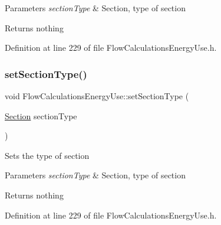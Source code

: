 \begin{DoxyParams}{Parameters}
{\em section\+Type} & Section, type of section\\
\hline
\end{DoxyParams}
\begin{DoxyReturn}{Returns}
nothing 
\end{DoxyReturn}


Definition at line 229 of file Flow\+Calculations\+Energy\+Use.\+h.

\mbox{\label{class_flow_calculations_energy_use_add93257048914dbd920b6dc2be431b69}} 
\subsubsection{\texorpdfstring{set\+Section\+Type()}{setSectionType()}\hspace{0.1cm}{\footnotesize\ttfamily [3/3]}}
{\footnotesize\ttfamily void Flow\+Calculations\+Energy\+Use\+::set\+Section\+Type (\begin{DoxyParamCaption}\item[{\hyperlink{class_flow_calculations_energy_use_afbabab0da698748de91369a5dfc7662a}{Section}}]{section\+Type }\end{DoxyParamCaption})\hspace{0.3cm}{\ttfamily [inline]}}

Sets the type of section


\begin{DoxyParams}{Parameters}
{\em section\+Type} & Section, type of section\\
\hline
\end{DoxyParams}
\begin{DoxyReturn}{Returns}
nothing 
\end{DoxyReturn}


Definition at line 229 of file Flow\+Calculations\+Energy\+Use.\+h.

\mbox{\label{class_flow_calculations_energy_use_abafa34d337124a1487fb0c871ea8a24a}} 
